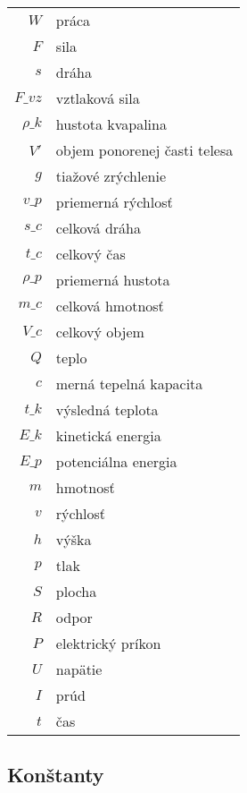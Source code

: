 \documentclass[vyfuk,\classoptions]{fksgeneric}
\begin{document}
\begin{framed}
\begin{multicols}{2}
\begin{center}
\begin{tabular}{ r l }
$W$ & práca \\
$F$ & sila\\
$s$ & dráha \\
$F\_{vz}$ & vztlaková sila\\
$\rho\_k$ & hustota kvapalina\\
$V'$ & objem ponorenej časti telesa\\
$g$ & tiažové zrýchlenie\\
$v\_p$ & priemerná rýchlosť \\
$s\_c$ & celková dráha \\
$t\_c$ & celkový čas \\
$\rho\_p$ & priemerná hustota \\
$m\_c$ & celková hmotnosť\\
$V\_c$ & celkový objem \\
$Q$ & teplo \\
$c$ & merná tepelná kapacita \\
$t\_k$ & výsledná teplota \\
$E\_{k}$ & kinetická energia \\
$E\_{p}$ & potenciálna energia \\
$m$ & hmotnosť\\
$v$ & rýchlosť\\
$h$ & výška \\
$p$ & tlak \\
$S$ & plocha \\
$R$ & odpor \\
$P$ & elektrický príkon \\
$U$ & napätie \\
$I$ & prúd \\
$t$ & čas\\
\end{tabular}
\end{center}

\end{multicols}
\end{framed}

\subsection{Konštanty}
\end{document}
